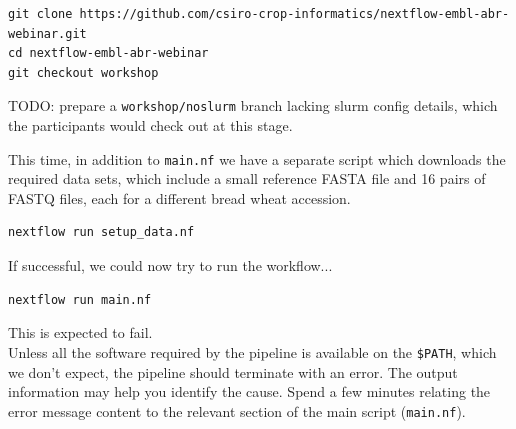 \begin{steps}
\begin{lstlisting}
git clone https://github.com/csiro-crop-informatics/nextflow-embl-abr-webinar.git
cd nextflow-embl-abr-webinar
git checkout workshop
\end{lstlisting}

\begin{warning}
TODO: prepare a \texttt{workshop/noslurm} branch lacking slurm config details, 
which the participants would check out at this stage.
\end{warning}

This time, in addition to \texttt{main.nf} we have a separate script which downloads the required data sets, which include a small reference FASTA file and 16 pairs of FASTQ files, each for a different bread wheat accession.


\begin{lstlisting}
nextflow run setup_data.nf
\end{lstlisting}


If successful, we could now try to run the workflow...

\begin{lstlisting}
nextflow run main.nf
\end{lstlisting}

\begin{warning}
This is expected to fail.\\
Unless all the software required by the pipeline is available on the \texttt{\$PATH},
which we don't expect, the pipeline should terminate with an error.
The output information may help you identify the cause. 
Spend a few minutes relating the error message content to the relevant section of the main script (\texttt{main.nf}). 
\end{warning}




\end{steps}

